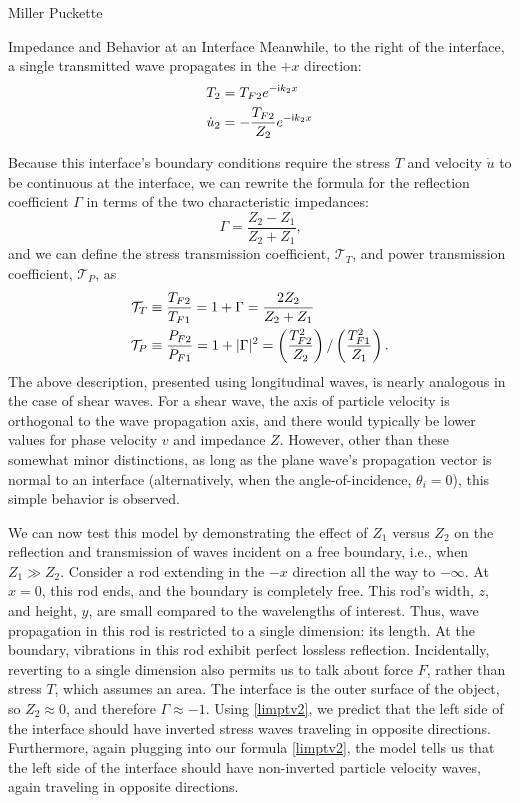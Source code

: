 \documentclass[a4paper,10pt]{report}
\numberwithin{equation}{section}
\begin{document}
\begin{chapter}{Miller Puckette}
\begin{section}{Impedance and Behavior at an Interface}
Meanwhile, to the right of the interface, a single transmitted wave propagates in the $+x$ direction:
\begin{align}\label{rimptv}
 T_{2} &= T_{F2}e^{-\mathsf{i}k_2x}\notag \\
 \dot{u}_{2} &= -\frac{T_{F2}}{Z_2}e^{-\mathsf{i}k_2x}
\end{align}

Because this interface's boundary conditions require the stress $T$ and velocity $\dot{u}$ to be continuous at the interface, we can rewrite the formula for the reflection coefficient $\Gamma$ in terms of the two characteristic impedances:
\begin{equation}\label{zgamma}
 \Gamma = \frac{Z_2 - Z_1}{Z_2 + Z_1} \text{,}
\end{equation}
and we can define the stress transmission coefficient, $\mathcal{T}_T$, and power transmission coefficient, $\mathcal{T}_P$, as
\begin{align}\label{stc_ptc}
\mathcal{T}_T &\equiv \frac{T_{F2}}{T_{F1}} = 1 + \Gamma = \frac{2Z_2}{Z_2 + Z_1}\notag\\
\mathcal{T}_P &\equiv \frac{P_{F2}}{P_{F1}} = 1 + | \Gamma |^2  = \left(\frac{T_{F2}^2}{Z_2}\right)/\left(\frac{T_{F1}^2}{Z_1}\right) \text{.}
\end{align}
The above description, presented using longitudinal waves, is nearly analogous in the case of shear waves. For a shear wave, the axis of particle velocity is orthogonal to the wave propagation axis, and there would typically be lower values for phase velocity $v$ and impedance $Z$. However, other than these somewhat minor distinctions, as long as the plane wave's propagation vector is normal to an interface (alternatively, when the angle-of-incidence, $\theta_i = 0$), this simple behavior is observed.\cite[pp.~9-14]{Kino1987}

We can now test this model by demonstrating the effect of $Z_1$ versus $Z_2$ on the reflection and transmission of waves incident on a free boundary, i.e., when $Z_1 \gg Z_2$. Consider a rod extending in the $-x$ direction all the way to $-\infty$. At $x = 0$, this rod ends, and the boundary is completely free. This rod's width, $z$, and height, $y$, are small compared to the wavelengths of interest. Thus, wave propagation in this rod is restricted to a single dimension: its length. At the boundary, vibrations in this rod exhibit perfect lossless reflection. Incidentally, reverting to a single dimension also permits us to talk about force $F$, rather than stress $T$, which assumes an area. The interface is the outer surface of the object, so $Z_2 \approx 0$, and therefore $\Gamma \approx -1$. Using \eqref{limptv2}, we predict that the left side of the interface should have inverted stress waves traveling in opposite directions. Furthermore, again plugging into our formula \eqref{limptv2}, the model tells us 
that the left side of the interface should have non-inverted particle velocity waves, again traveling in opposite directions. 


\end{section}
\end{chapter}
\end{document}
